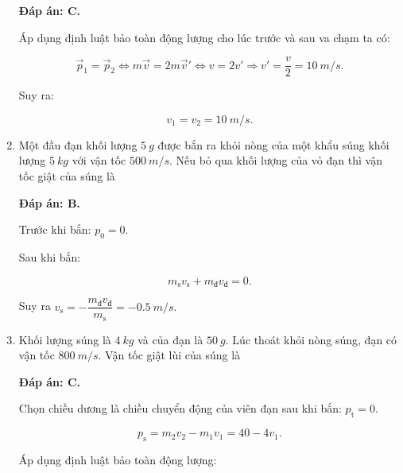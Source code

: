 \begin{enumerate}[label=\bfseries Câu \arabic*:]
	\hideall
	{	\textbf{Đáp án: C.}
		
		Áp dụng định luật bảo toàn động lượng cho lúc trước và sau va chạm ta có:
		
		$$\vec p_1 = \vec p_2 \Leftrightarrow m\vec v = 2m \vec v' \Leftrightarrow v = 2v' \Rightarrow v' = \dfrac{v}{2} = \SI{10}{m/s}.$$
		
		Suy ra:
		
		$$v_1 = v_2 = \SI{10}{m/s}.$$
	}
	\item {}
	
	
	{Một đầu đạn khối lượng $\SI{5}{g}$ được bắn ra khỏi nòng của một khẩu súng khối lượng $\SI{5}{kg}$ với vận tốc $\SI{500}{m/s}$. Nếu bỏ qua khối lượng của vỏ đạn thì vận tốc giật của súng là
	}
	
	\hideall
	{
		\textbf{Đáp án: B.}
		
		Trước khi bắn: $p_0 = 0$.
		
		Sau khi bắn:
		
		$$m_\text{s}v_\text{s} + m_\text{đ}v_\text{đ} = 0.$$
		
		Suy ra $v_\text{s} = - \dfrac{m_\text{đ}v_\text{đ}}{m_\text{s}} = -\SI{0,5}{m/s}.$
		
	}
	\item {}
	
	
	{Khối lượng súng là $\SI{4}{kg}$ và của đạn là $\SI{50}{g}$. Lúc thoát khỏi nòng súng, đạn có vận tốc $\SI{800}{m/s}$. Vận tốc giật lùi của súng là
	}
	
	\hideall
	{	\textbf{Đáp án: C.}
		
		Chọn chiều dương là chiều chuyển động của viên đạn sau khi bắn: $p_\text{t} = 0.$
		
		$$p_\text{s} = m_2v_2 - m_1v_1 = 40 - 4v_1.$$
		
		Áp dụng định luật bảo toàn động lượng:
		
}
\end{enumerate}
